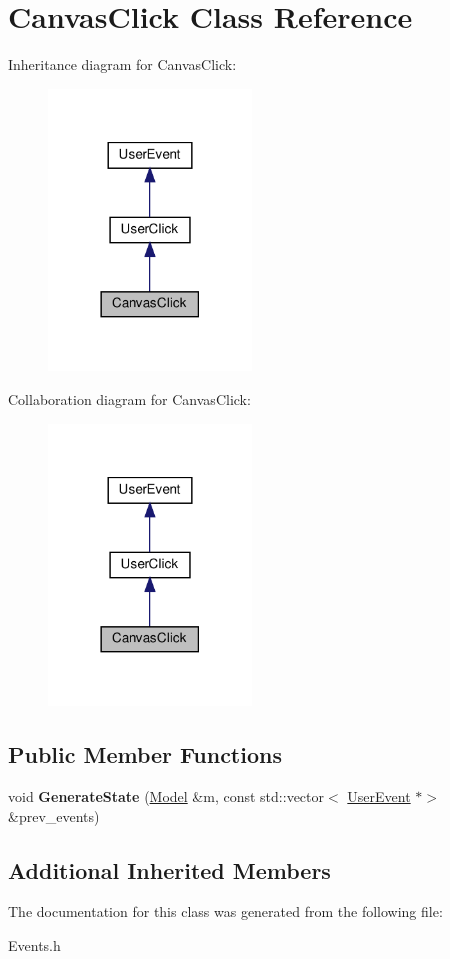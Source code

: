 \hypertarget{classCanvasClick}{}\section{Canvas\+Click Class Reference}
\label{classCanvasClick}


Inheritance diagram for Canvas\+Click\+:\nopagebreak
\begin{figure}[H]
\begin{center}
\leavevmode
\includegraphics[width=153pt]{classCanvasClick__inherit__graph}
\end{center}
\end{figure}


Collaboration diagram for Canvas\+Click\+:\nopagebreak
\begin{figure}[H]
\begin{center}
\leavevmode
\includegraphics[width=153pt]{classCanvasClick__coll__graph}
\end{center}
\end{figure}
\subsection*{Public Member Functions}
\begin{DoxyCompactItemize}
\item 
\mbox{\label{classCanvasClick_ad6fda498a2793d9db6afdf5ebaca0e77}} 
void {\bfseries Generate\+State} (\hyperlink{classModel}{Model} \&m, const std\+::vector$<$ \hyperlink{classUserEvent}{User\+Event} $\ast$$>$ \&prev\+\_\+events)
\end{DoxyCompactItemize}
\subsection*{Additional Inherited Members}


The documentation for this class was generated from the following file\+:\begin{DoxyCompactItemize}
\item 
Events.\+h\end{DoxyCompactItemize}
